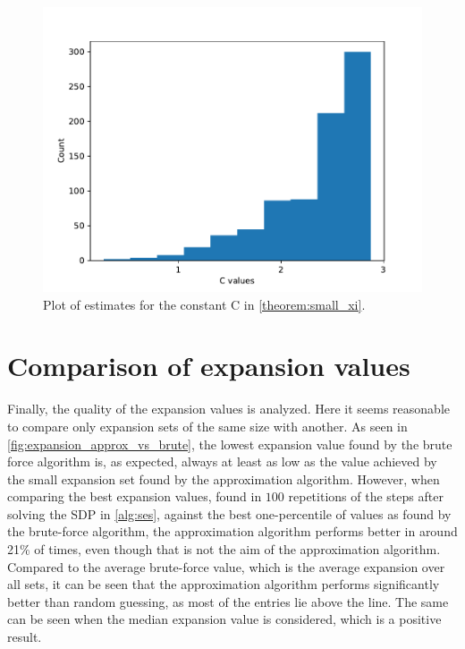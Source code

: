 \begin{figure}
	\centering
	\includegraphics[scale=1]{figures/quality_evaluation_log_C_estimates.pdf}
	\caption[Plot C estimates]{Plot of estimates for the constant C in \cref{theorem:small_xi}.\label{fig:c_estimates}}
\end{figure}





\section{Comparison of expansion values}




Finally, the quality of the expansion values is analyzed. Here it seems reasonable to compare only expansion sets of the same size with another. As seen in \cref{fig:expansion_approx_vs_brute}, the lowest expansion value found by the brute force algorithm is, as expected, always at least as low as the value achieved by the small expansion set found by the approximation algorithm. However, when comparing the best expansion values, found in $100$ repetitions of the steps after solving the SDP in \cref{alg:ses}, against the best one-percentile of values as found by the brute-force algorithm, the approximation algorithm performs better in around 21\% of times, even though that is not the aim of the approximation algorithm. Compared to the average brute-force value, which is the average expansion over all sets, it can be seen that the approximation algorithm performs significantly better than random guessing, as most of the entries lie above the line. The same can be seen when the median expansion value is considered, which is a positive result. 

